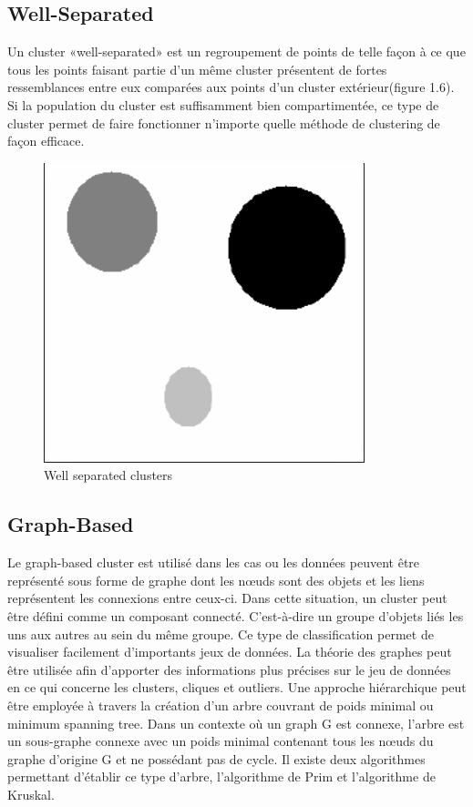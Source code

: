 \documentclass[memoire.tex]{subfiles}
\begin{document}
\subsection{Well-Separated}
Un cluster «well-separated» est un regroupement de points de telle façon à ce que tous les points faisant partie d'un même cluster présentent de fortes ressemblances entre eux comparées aux points d'un cluster extérieur(figure 1.6). Si la population du cluster est suffisamment bien compartimentée, ce type de cluster permet de faire fonctionner n'importe quelle méthode de clustering de façon efficace.
	\begin{figure}[h!]
		\centerline{\includegraphics[scale=0.5]{img/well_separated.png}}
		\caption{Well separated clusters}
	\end{figure}

\subsection{Graph-Based}
Le graph-based cluster est utilisé dans les cas ou les données peuvent être représenté sous forme de graphe dont les nœuds sont des objets et les liens représentent les connexions entre ceux-ci. Dans cette situation, un cluster peut être défini comme un composant connecté.  C'est-à-dire un groupe d'objets liés les uns aux autres au sein du même groupe. Ce type de classification permet de visualiser facilement d'importants jeux de données.
La théorie des graphes peut être utilisée afin d’apporter des informations plus précises sur le jeu de données en ce qui concerne les clusters, cliques et outliers. Une approche hiérarchique peut être employée à travers la création d’un arbre couvrant de poids minimal ou minimum spanning tree. Dans un contexte où un graph G est connexe, l’arbre est un sous-graphe connexe avec un poids minimal contenant tous les nœuds du graphe d’origine G et ne possédant pas de cycle. Il existe deux algorithmes permettant d’établir ce type d’arbre, l’algorithme de Prim et l’algorithme de Kruskal.
\end{document}
